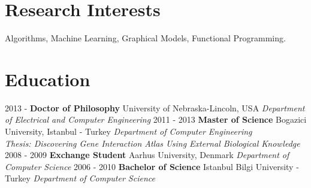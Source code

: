 \documentclass[showupdate]{xqcv}
\begin{document}


\address{1432 B St Apt 2\\
         Lincoln, Nebraska 68502, USA
       }
\headerboxheight{6cm} %


\maketitle

\section{Research Interests}
Algorithms, Machine Learning, Graphical Models, Functional Programming.

\section{Education}
\begin{entrylist}
  \entry
  {2013 -}
  {\textbf{Doctor of Philosophy}}
  {University of Nebraska-Lincoln, USA}
  {
    \textit{Department of Electrical and Computer Engineering}
  }
  \entry
  {2011 - 2013}
  {\textbf{Master of Science}}
  {Bogazici University, Istanbul - Turkey}
  {
   \textit{Department of Computer Engineering} \\
   \textit{\footnotesize{Thesis: Discovering Gene Interaction Atlas Using External Biological Knowledge}}
   }
   \entry
   {2008 - 2009}
   {\textbf{Exchange Student}}
   {Aarhus University, Denmark}
   {
    \textit{Department of Computer Science}
   }
  \entry
  {2006 - 2010}
  {\textbf{Bachelor of Science}}
  {Istanbul Bilgi University - Turkey}
  {\textit{Department of Computer Science}}
\end{entrylist}
\end{document}
